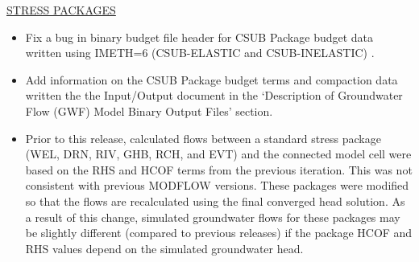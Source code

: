 \begin{itemize}
	\underline{STRESS PACKAGES}
	\begin{itemize}
		\item Fix a bug in binary budget file header for CSUB Package budget data written using IMETH=6 (CSUB-ELASTIC and CSUB-INELASTIC) .
		\item Add information on the CSUB Package budget terms and compaction data written the the Input/Output document in the `Description of Groundwater Flow (GWF) Model Binary Output Files' section.
		\item Prior to this release, calculated flows between a standard stress package (WEL, DRN, RIV, GHB, RCH, and EVT) and the connected model cell were based on the RHS and HCOF terms from the previous iteration.  This was not consistent with previous MODFLOW versions.  These packages were modified so that the flows are recalculated using the final converged head solution.  As a result of this change, simulated groundwater flows for these packages may be slightly different (compared to previous releases) if the package HCOF and RHS values depend on the simulated groundwater head.
	\end{itemize}


\end{itemize}
